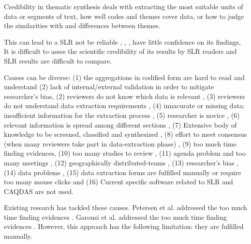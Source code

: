 \documentclass{article}
\begin{document}
Credibility in thematic synthesis deals with extracting the most suitable units of data or segments of text, how well codes and themes cover data, or how to judge the similarities with and differences between themes.

This can lead to a SLR not be reliable \cite{Garousi2017}, \cite{Wohlin2013}, \cite{Kitchenham2011}, have little confidence on its findings, It is difficult to asses the scientific credibility of its results by SLR  readers and SLR results are difficult to compare. 

Causes can be diverse:
(1) the aggregations in codified form are hard to read and understand \cite{Dieste2008}
(2) lack of internal/external validation in order to mitigate researcher's bias\cite{Ampatzoglou2019}, 
(2) reviewers do not know which data is relevant \cite{Brereton2011}, (3) reviewers do not understand data extraction requirements \cite{Brereton2007} \cite{Zhou2017}, (4) innacurate or missing data: insufficient information for the extraction process \cite{Zhou2017}, (5) researcher is novice \cite{Ribeiro2018} \cite{Carver2013}, (6) relevant information is spread among different sections \cite{Budgen2018} \cite{Budgen2018}, (7) Extensive body of knowledge to be screened, classified and synthesized \cite{link.springer.com}, (8) effort to meet consensus (when many reviewers take part in data-extraction phase) \cite{Ribeiro2018} \cite{Riaz2010} \cite{Brereton2007} \cite{Staples2007} \cite{Bandara2015}, (9) too much time finding evidences, (10) too many studies to review \cite{Garousi2017}, (11) agenda problem and too many meetings \cite{Staples2007} \cite{Staples2007}, (12) geographically distributed-teams \cite{Riaz2010}, (13) researcher's bias \cite{Imtiaz2013} \cite{Ribeiro2018} \cite{Zhou2017} \cite{Ampatzoglou2019}, (14) data problems \cite{Bandara2015}, (15) data extraction forms are fulfilled manually or require too many mouse clicks \cite{Staples2007} \cite{Ramezani2017} \cite{Ramezani2017} \cite{Bandara2015} \cite{LU2008} and (16) Current specific software related to SLR and CAQDAS are not used. 
    
Existing research has tackled these causes. Petersen et al. addressed the too much time finding evidences \cite{Petersen2015}. Garousi et al. addressed the too much time finding evidences \cite{Garousi2017}. However, this approach has the following limitation: they are fulfilled manually.
\end{document}
